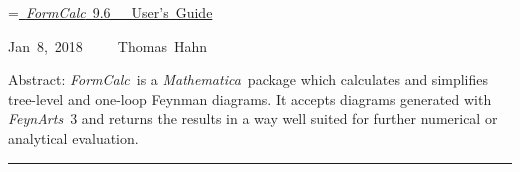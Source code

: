 \documentclass[twoside,11pt]{article}
\def\FA{\textit{FeynArts}}
\def\FC{\textit{FormCalc}}
\def\mma{\textit{Mathematica}}
\begin{document}
\thispagestyle{empty}

\vspace*{.7\textheight}

\newbox\titlebox\setbox\titlebox=\hbox{\underline{%
\vrule width 0pt height 0pt depth 2ex%
\Huge \FC~9.6~~~User's Guide}}

\hfill\copy\titlebox

\vspace*{1ex}

\hfill\hbox{Jan 8, 2018~~~~~Thomas Hahn}

\bigskip
\bigskip

\hfill\parbox{\wd\titlebox}{%
\begin{small}
Abstract:
\FC\ is a \mma\ package which calculates and simplifies tree-level and
one-loop Feynman diagrams.  It accepts diagrams generated with \FA\ 3
and returns the results in a way well suited for further numerical or
analytical evaluation.
\end{small}}

\clearpage

\vspace*{.5\textheight}
\vfill

\hrule

\medskip
\end{document}
